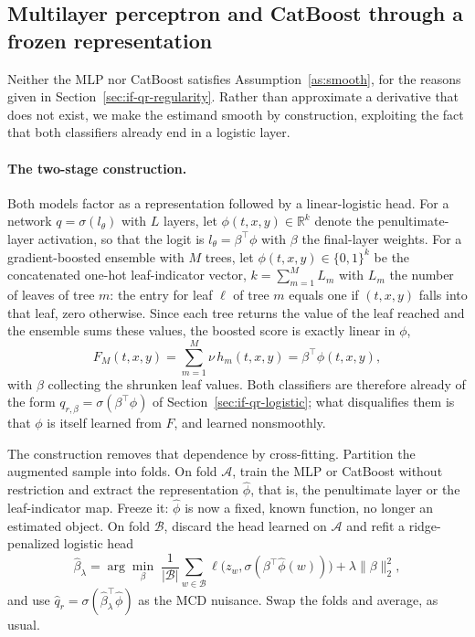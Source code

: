 \documentclass[11pt]{article}
\begin{document}
\subsection{Multilayer perceptron and CatBoost through a frozen representation}
\label{sec:if-qr-frozen}

Neither the MLP nor CatBoost satisfies Assumption~\ref{as:smooth}, for the reasons
given in Section~\ref{sec:if-qr-regularity}. Rather than approximate a derivative that
does not exist, we make the estimand smooth by construction, exploiting the fact that
both classifiers already end in a logistic layer.

\paragraph{The two-stage construction.}
Both models factor as a representation followed by a linear-logistic head. For a
network $q=\sigma(l_\theta)$ with $L$ layers, let $\phi(t,x,y)\in\mathbb{R}^k$ denote
the penultimate-layer activation, so that the logit is $l_\theta=\beta^\top\phi$ with
$\beta$ the final-layer weights. For a gradient-boosted ensemble with $M$ trees, let
$\phi(t,x,y)\in\{0,1\}^k$ be the concatenated one-hot leaf-indicator vector,
$k=\sum_{m=1}^M L_m$ with $L_m$ the number of leaves of tree $m$: the entry for leaf
$\ell$ of tree $m$ equals one if $(t,x,y)$ falls into that leaf, zero otherwise. Since
each tree returns the value of the leaf reached and the ensemble sums these values, the
boosted score is exactly linear in $\phi$,
\[
F_M(t,x,y) = \sum_{m=1}^M \nu\,h_m(t,x,y) = \beta^\top\phi(t,x,y),
\]
with $\beta$ collecting the shrunken leaf values. Both classifiers are therefore
already of the form $q_{r,\beta}=\sigma(\beta^\top\phi)$ of
Section~\ref{sec:if-qr-logistic}; what disqualifies them is that $\phi$ is itself
learned from $F$, and learned nonsmoothly.

The construction removes that dependence by cross-fitting. Partition the augmented
sample into folds. On fold $\mathcal{A}$, train the MLP or CatBoost without
restriction and extract the representation $\hat\phi$, that is, the penultimate layer
or the leaf-indicator map. Freeze it: $\hat\phi$ is now a fixed, known function, no
longer an estimated object. On fold $\mathcal{B}$, discard the head learned on
$\mathcal{A}$ and refit a ridge-penalized logistic head
\[
\hat\beta_\lambda = \arg\min_\beta\; \frac{1}{|\mathcal{B}|}\sum_{w\in\mathcal{B}} \ell\big(z_w,\sigma(\beta^\top\hat\phi(w))\big) + \lambda\|\beta\|_2^2 ,
\]
and use $\hat q_r=\sigma(\hat\beta_\lambda^\top\hat\phi)$ as the MCD nuisance. Swap the
folds and average, as usual.
\end{document}
